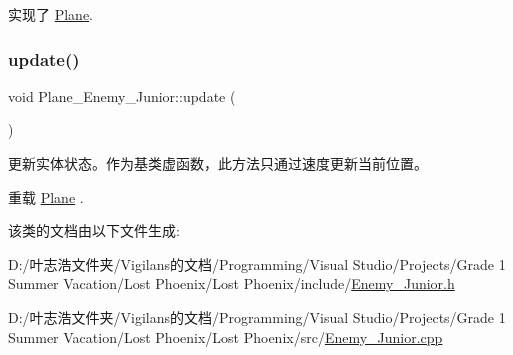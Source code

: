 实现了 \hyperlink{class_plane_af999499b5e79309d94004e8d012fe9c4}{Plane}.

\mbox{\label{class_plane___enemy___junior_a686e46c9927793dd07235cac72d52405}} 
\subsubsection{\texorpdfstring{update()}{update()}}
{\footnotesize\ttfamily void Plane\+\_\+\+Enemy\+\_\+\+Junior\+::update (\begin{DoxyParamCaption}{ }\end{DoxyParamCaption})\hspace{0.3cm}{\ttfamily [virtual]}}



更新实体状态。作为基类虚函数，此方法只通过速度更新当前位置。 



重载 \hyperlink{class_plane_a7fbb07f76503fe057772e01f542afc32}{Plane} .



该类的文档由以下文件生成\+:\begin{DoxyCompactItemize}
\item 
D\+:/叶志浩文件夹/\+Vigilans的文档/\+Programming/\+Visual Studio/\+Projects/\+Grade 1 Summer Vacation/\+Lost Phoenix/\+Lost Phoenix/include/\hyperlink{_enemy___junior_8h}{Enemy\+\_\+\+Junior.\+h}\item 
D\+:/叶志浩文件夹/\+Vigilans的文档/\+Programming/\+Visual Studio/\+Projects/\+Grade 1 Summer Vacation/\+Lost Phoenix/\+Lost Phoenix/src/\hyperlink{_enemy___junior_8cpp}{Enemy\+\_\+\+Junior.\+cpp}\end{DoxyCompactItemize}
